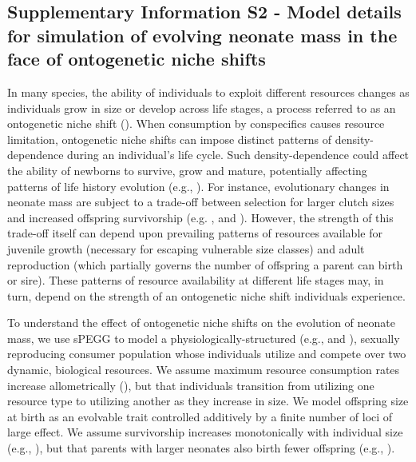 \documentclass[11pt]{article}
\begin{document}
\begin{linenumbers}
\renewcommand\linenumberfont{\normalfont\small}
\setlength\linenumbersep{1cm}

  \renewcommand{\theequation}{S2-\arabic{equation}}
 
\setcounter{equation}{0}  %
\section*{Supplementary Information S2 - Model details for simulation of evolving neonate mass in the face of ontogenetic niche shifts}

In many species, the ability of individuals to exploit different resources changes as individuals grow in size or develop across life stages, a process referred to as an ontogenetic niche shift (\citealt{werner84}). When consumption by conspecifics causes resource limitation, ontogenetic niche shifts can impose distinct patterns of density-dependence during an individual's life cycle. Such density-dependence could affect the ability of newborns to survive, grow and mature, potentially affecting patterns of life history evolution (e.g., \citealt{mueller91}). For instance, evolutionary changes in neonate mass are subject to a trade-off between selection for larger clutch sizes and increased offspring survivorship (e.g. \citealt{lack66}, \citealt{parker86} and \citealt{roff01}). However, the strength of this trade-off itself can depend upon prevailing patterns of resources available for juvenile growth (necessary for escaping vulnerable size classes) and adult reproduction (which partially governs the number of offspring a parent can birth or sire). These patterns of resource availability at different life stages may, in turn, depend on the strength of an ontogenetic niche shift individuals experience.

To understand the effect of ontogenetic niche shifts on the evolution of neonate mass, we use sPEGG to model a physiologically-structured (e.g., \citealt{persson98} and \citealt{deroos01}), sexually reproducing consumer population whose individuals utilize and compete over two dynamic, biological resources. We assume maximum resource consumption rates increase allometrically (\citealt{brown04}), but that individuals transition from utilizing one resource type to utilizing another as they increase in size. We model offspring size at birth as an evolvable trait controlled additively by a finite number of loci of large effect. We assume survivorship increases monotonically with individual size (e.g., \citealt{werner84}), but that parents with larger neonates also birth fewer offspring (e.g., \citealt{parker86}). 


\end{linenumbers}
\end{document}

